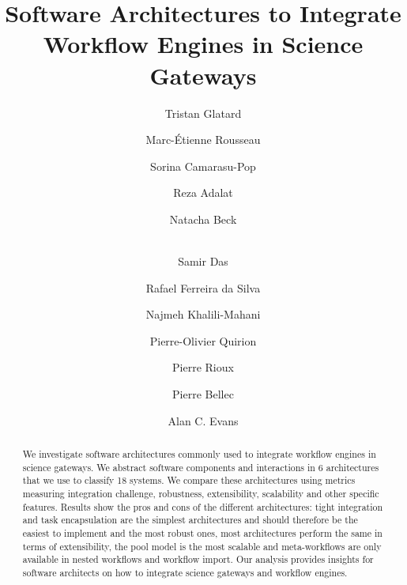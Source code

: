 \documentclass[preprint,3p,twocolumn]{elsarticle}
\begin{document}
\begin{frontmatter}



\title{Software Architectures to Integrate Workflow Engines in Science Gateways}


\author[mcgill,creatis]{Tristan Glatard}
\author[mcgill]{Marc-\'Etienne Rousseau}
\author[creatis]{Sorina Camarasu-Pop}

\author[mcgill]{Reza Adalat}
\author[mcgill]{Natacha Beck}
\author[mcgill]{\\Samir Das}
\author[isi]{Rafael Ferreira da Silva}
\author[mcgill]{Najmeh Khalili-Mahani}
\author[criugm]{Pierre-Olivier Quirion}
\author[mcgill]{Pierre Rioux}

\author[criugm]{Pierre Bellec}
\author[mcgill]{Alan C. Evans}

\address[mcgill]{McGill Centre for Integrative Neuroscience, Montreal Neurological Institute, McGill University, Canada.}
\address[creatis]{University of Lyon, CNRS, INSERM, CREATIS, Villeurbanne, France.}
\address[criugm]{Centre de Recherche de l'Institut de G\'eriatrie de Montr\'eal CRIUGM, Montr\'eal, QC, Canada.}
\address[isi]{University of Southern California, Information Sciences Institute, Marina del Rey, CA, USA.}

\begin{abstract}
  We investigate software architectures commonly used to integrate
  workflow engines in science gateways. We abstract software
  components and interactions in 6 architectures that we use to
  classify 18 systems. We compare these architectures using metrics
  measuring integration challenge, robustness, extensibility, scalability
  and other specific features. Results show the pros and cons of the
  different architectures: tight integration and task encapsulation are the
  simplest architectures and should therefore be the easiest to
  implement and the most robust ones, most architectures perform the
  same in terms of extensibility, the pool model is the most scalable
  and meta-workflows are only available in nested workflows and
  workflow import. Our analysis provides insights for software
  architects on how to integrate science gateways and workflow
  engines.
\end{abstract}


\end{frontmatter}
\end{document}
